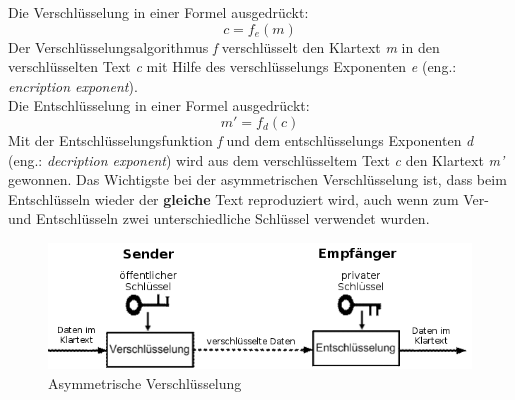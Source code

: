 Die Verschlüsselung in einer Formel ausgedrückt:\\
\begin{equation*}
  c = f_e (m)
  \label{eqn:asy_versch}
\end{equation*}
Der Verschlüsselungsalgorithmus \textit{f} verschlüsselt den Klartext \textit{m} in den verschlüsselten Text \textit{c} mit Hilfe des verschlüsselungs Exponenten \textit{e} (eng.: \textit{encription exponent}).\\
Die Entschlüsselung in einer Formel ausgedrückt:
\begin{equation*}
  m' = f_d (c) 
  \label{eqn:asy_entsch}
\end{equation*}
Mit der Entschlüsselungsfunktion \textit{f} und dem entschlüsselungs Exponenten \textit{d} (eng.: \textit{decription exponent}) wird aus dem verschlüsseltem Text \textit{c} den Klartext \textit{m'} gewonnen.
%
Das Wichtigste bei der asymmetrischen Verschlüsselung ist, dass beim Entschlüsseln wieder der \textbf{gleiche} Text reproduziert wird, auch wenn zum Ver- und Entschlüsseln zwei unterschiedliche Schlüssel verwendet wurden.\\
%
\begin{figure}[ht]
\begin{center}
\includegraphics[width=15cm]{images/asymmetrischeVerschluesselung.png}
\caption{Asymmetrische Verschlüsselung}
\end{center}
\end{figure}
